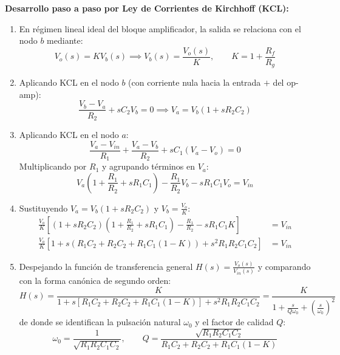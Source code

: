\documentclass[11pt, a4paper]{article}
\begin{document}
\textbf{Desarrollo paso a paso por Ley de Corrientes de Kirchhoff (KCL):}
\begin{enumerate}[noitemsep]
    \item En régimen lineal ideal del bloque amplificador, la salida se relaciona con el nodo $b$ mediante:
    \begin{equation}
        V_o(s) = K V_b(s) \implies V_b(s) = \frac{V_o(s)}{K}, \qquad K = 1 + \frac{R_f}{R_g}
    \end{equation}
    \item Aplicando KCL en el nodo $b$ (con corriente nula hacia la entrada $+$ del op-amp):
    \begin{equation}
        \frac{V_b - V_a}{R_2} + sC_2 V_b = 0 \implies V_a = V_b(1 + sR_2 C_2)
    \end{equation}
    \item Aplicando KCL en el nodo $a$:
    \begin{equation}
        \frac{V_a - V_{in}}{R_1} + \frac{V_a - V_b}{R_2} + sC_1(V_a - V_o) = 0
    \end{equation}
    Multiplicando por $R_1$ y agrupando términos en $V_a$:
    \begin{equation}
        V_a\left(1 + \frac{R_1}{R_2} + sR_1 C_1\right) - \frac{R_1}{R_2}V_b - sR_1 C_1 V_o = V_{in}
    \end{equation}
    \item Sustituyendo $V_a = V_b(1 + sR_2 C_2)$ y $V_b = \frac{V_o}{K}$:
    \begin{align}
        \frac{V_o}{K}\left[(1 + sR_2 C_2)\left(1 + \frac{R_1}{R_2} + sR_1 C_1\right) - \frac{R_1}{R_2} - sR_1 C_1 K\right] &= V_{in} \\
        \frac{V_o}{K}\left[1 + s\left(R_1 C_2 + R_2 C_2 + R_1 C_1(1 - K)\right) + s^2 R_1 R_2 C_1 C_2\right] &= V_{in}
    \end{align}
    \item Despejando la función de transferencia general $H(s) = \frac{V_o(s)}{V_{in}(s)}$ y comparando con la forma canónica de segundo orden:
    \begin{equation}
        H(s) = \frac{K}{1 + s\left[R_1 C_2 + R_2 C_2 + R_1 C_1(1 - K)\right] + s^2 R_1 R_2 C_1 C_2} = \frac{K}{1 + \frac{s}{Q\omega_0} + \left(\frac{s}{\omega_0}\right)^2}
    \end{equation}
    de donde se identifican la pulsación natural $\omega_0$ y el factor de calidad $Q$:
    \begin{equation}
        \omega_0 = \frac{1}{\sqrt{R_1 R_2 C_1 C_2}}, \qquad Q = \frac{\sqrt{R_1 R_2 C_1 C_2}}{R_1 C_2 + R_2 C_2 + R_1 C_1(1 - K)}

\end{equation}
\end{enumerate}
\end{document}
